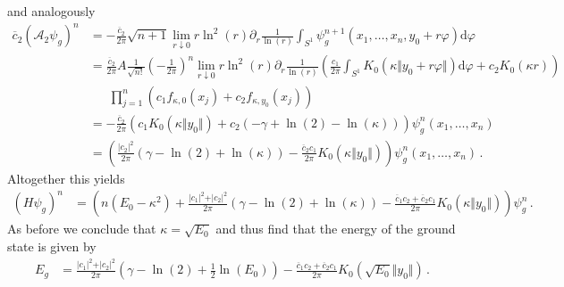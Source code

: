 and analogously
\begin{align*}
  \overline{c}_{2}
  (\mathcal{A}_{2}\psi_{g})^{n}
  &=
  -
  \frac{\overline{c}_{2}}{2\pi}
  \sqrt{n + 1}
  \lim_{r \downarrow 0}
  r\ln^{2}(r)
  \partial_{r}
  \frac{1}{\ln(r)}
  \int_{S^{1}}
  \psi_{g}^{n + 1}
  \left(
    x_{1}
    ,
    \dots
    ,
    x_{n}
    ,
    y_{0}
    +
    r\varphi
  \right)
  \mathrm{d}\varphi
  \\
  &=
  \frac{\overline{c}_{2}}{2\pi}
  A
  \frac{1}{\sqrt{n!}}
  \left(
    -
    \frac{1}{2\pi}
  \right)^{n}
  \lim_{r \downarrow 0}
  r\ln^{2}(r)
  \partial_{r}
  \frac{1}{\ln(r)}
  \left(
    \frac{c_{1}}{2\pi}
    \int_{S^{1}}
    K_{0}
    \left(
      \kappa
      \Vert y_{0} + r\varphi \Vert
    \right)
    \mathrm{d}\varphi
    +
    c_{2}
    K_{0}(\kappa r)
  \right)
  \\
  &\phantom{=\ }
  \prod_{j = 1}^{n}
  \left(
    c_{1}
    f_{\kappa,0}(x_{j})
    +
    c_{2}
    f_{\kappa,y_{0}}(x_{j})
  \right)
  \\
  &=
  -
  \frac{\overline{c}_{2}}{2\pi}
  \left(
    c_{1}
    K_{0}(\kappa\Vert y_{0} \Vert)
    +
    c_{2}
    \left(
      -
      \gamma
      +
      \ln(2)
      -
      \ln(\kappa)
    \right)
  \right)
  \psi_{g}^{n}
  \left(
    x_{1}
    ,
    \dots
    ,
    x_{n}
  \right)
  \\
  &=
  \left(
    \frac{\vert c_{2} \vert^{2}}{2\pi}
    \left(
      \gamma
      -
      \ln(2)
      +
      \ln(\kappa)
    \right)
    -
    \frac{\overline{c}_{2}c_{1}}{2\pi}
    K_{0}(\kappa\Vert y_{0} \Vert)
  \right)
  \psi_{g}^{n}
  \left(
    x_{1}
    ,
    \dots
    ,
    x_{n}
  \right)
  \,.
\end{align*}
Altogether this yields
\begin{align*}
  (H\psi_{g})^{n}
  &=
  \left(
    n
    (E_{0} - \kappa^{2})
    +
    \frac{\vert c_{1} \vert^{2} + \vert c_{2} \vert^{2}}{2\pi}
    \left(
      \gamma
      -
      \ln(2)
      +
      \ln(\kappa)
    \right)
    -
    \frac{\overline{c}_{1}c_{2} + \overline{c}_{2}c_{1}}{2\pi}
    K_{0}(\kappa\Vert y_{0} \Vert)
  \right)
  \psi_{g}^{n}
  \,.
\end{align*}
As before we conclude that $\kappa = \sqrt{E_{0}}$ and thus find that the energy of the ground state is given by
\begin{align*}
  E_{g}
  &=
  \frac{\vert c_{1} \vert^{2} + \vert c_{2} \vert^{2}}{2\pi}
  \left(
    \gamma
    -
    \ln(2)
    +
    \frac{1}{2}
    \ln(E_{0})
  \right)
  -
  \frac{\overline{c}_{1}c_{2} + \overline{c}_{2}c_{1}}{2\pi}
  K_{0}
  \left(
    \sqrt{E_{0}}
    \Vert y_{0} \Vert
  \right)
  \,.
\end{align*}
